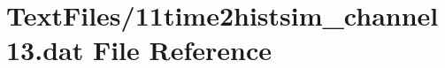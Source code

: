 \hypertarget{11time2histsim__channel13_8dat}{}\section{Text\+Files/11time2histsim\+\_\+channel13.dat File Reference}
\label{11time2histsim__channel13_8dat}
